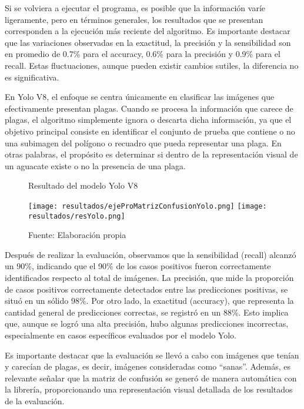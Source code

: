 Si se volviera a ejecutar el programa, es posible que la información varíe ligeramente, pero en términos generales, los resultados que se presentan corresponden a la ejecución más reciente del algoritmo. Es importante destacar que las variaciones observadas en la exactitud, la precisión y la sensibilidad son en promedio de 0.7\% para el accuracy, 0.6\% para la precisión y 0.9\% para el recall. Estas fluctuaciones, aunque pueden existir cambios sutiles, la diferencia no es significativa. \newline

En Yolo V8, el enfoque se centra únicamente en clasificar las imágenes que efectivamente  presentan plagas. Cuando se procesa la información que carece de plagas, el algoritmo  simplemente ignora o descarta dicha información, ya que el objetivo principal consiste en  identificar el conjunto de prueba que contiene o no una subimagen del polígono o recuadro que pueda representar una plaga. En otras palabras, el propósito es determinar si dentro de la representación visual de un aguacate existe o no la presencia de una plaga.

\newpage

\begin{figure}[h]
\centering
\caption{Resultado del modelo Yolo V8}
\texttt{[image: resultados/ejeProMatrizConfusionYolo.png]}
\texttt{[image: resultados/resYolo.png]}
\caption*{\footnotesize Fuente: Elaboración propia}
\label{fig:figuraEjeProMatrizConfusion}
\end{figure}

Después de realizar la evaluación, observamos que la sensibilidad (recall) alcanzó un 90\%, indicando que el 90\% de los casos positivos fueron correctamente identificados respecto al total de imágenes. La precisión, que mide la proporción de casos positivos correctamente detectados entre las predicciones positivas, se situó en un sólido 98\%. Por otro lado, la exactitud (accuracy), que representa la cantidad general de predicciones correctas, se registró en un 88\%. Esto implica que, aunque se logró una alta precisión, hubo algunas predicciones incorrectas, especialmente en casos específicos evaluados por el modelo Yolo.

\newpage

Es importante destacar que la evaluación se llevó a cabo con imágenes que tenían y carecían de plagas, es decir, imágenes consideradas como ``sanas''. Además, es relevante señalar que la matriz de confusión se generó de manera automática con la librería, proporcionando una representación visual detallada de los resultados de la evaluación. \newline


